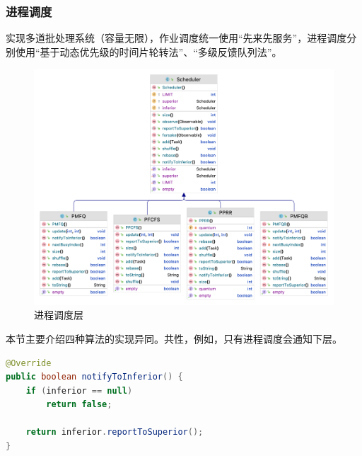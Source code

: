 \documentclass[12pt, a4paper, UTF8]{ctexart}
\begin{document}
\subsubsection{进程调度}
实现多道批处理系统（容量无限），作业调度统一使用“先来先服务”，进程调度分别使用“基于动态优先级的时间片轮转法”、“多级反馈队列法”。

\begin{figure}[htbp]
    \centering
    \includegraphics[scale=0.18]{t2-class.png}
    \caption{进程调度层}
\end{figure}

本节主要介绍四种算法的实现异同。共性，例如，只有进程调度会通知下层。
\begin{lstlisting}[language={java},caption={命令下层再次进行调度}]
@Override
public boolean notifyToInferior() {
    if (inferior == null)
        return false;

    return inferior.reportToSuperior();
}
\end{lstlisting}
\end{document}
